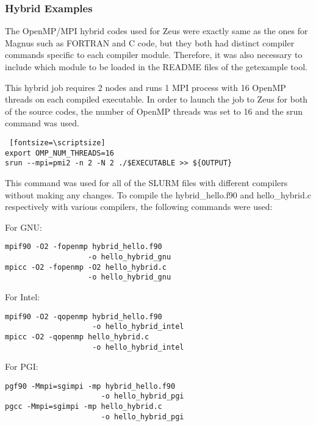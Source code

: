 \subsubsection{Hybrid Examples}

The OpenMP/MPI hybrid codes used for Zeus were exactly same as the ones for Magnus such as FORTRAN and C code, but they both had
distinct compiler commands specific to each compiler module. Therefore, it was also necessary to include which module to be loaded in the README files
of the getexample tool.

This hybrid job requires 2 nodes and runs 1 MPI process with 16 OpenMP threads on each compiled executable. In order to launch the job to Zeus for both 
of the source codes, the number of OpenMP threads was set to 16 and the srun command was used.

\begin{tcolorbox}
\begin{Verbatim} [fontsize=\scriptsize]
export OMP_NUM_THREADS=16
srun --mpi=pmi2 -n 2 -N 2 ./$EXECUTABLE >> ${OUTPUT}
\end{Verbatim}
\end{tcolorbox}

This command was used for all of the SLURM files with different compilers without making any changes. To compile the hybrid\_hello.f90 and 
hello\_hybrid.c respectively with various compilers, the following commands were used:

For GNU:

\begin{tcolorbox}
\begin{Verbatim}[fontsize=\scriptsize]
mpif90 -O2 -fopenmp hybrid_hello.f90 
                   -o hello_hybrid_gnu
mpicc -O2 -fopenmp -O2 hello_hybrid.c 
                   -o hello_hybrid_gnu
\end{Verbatim}
\end{tcolorbox}


For Intel:

\begin{tcolorbox}
\begin{Verbatim}[fontsize=\scriptsize]
mpif90 -O2 -qopenmp hybrid_hello.f90 
                    -o hello_hybrid_intel
mpicc -O2 -qopenmp hello_hybrid.c 
                    -o hello_hybrid_intel
\end{Verbatim}
\end{tcolorbox}

For PGI:

\begin{tcolorbox}
\begin{Verbatim}[fontsize=\scriptsize]
pgf90 -Mmpi=sgimpi -mp hybrid_hello.f90 
                      -o hello_hybrid_pgi
pgcc -Mmpi=sgimpi -mp hello_hybrid.c 
                      -o hello_hybrid_pgi
\end{Verbatim}
\end{tcolorbox}
